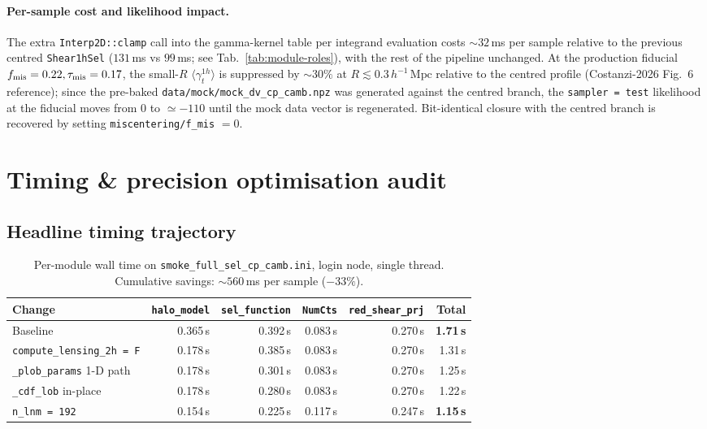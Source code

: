 \documentclass[a4paper, 11pt]{article}
\newcommand{\hMpc}{h^{-1}\,\mathrm{Mpc}}
\newcommand{\modname}[1]{\textcolor{kwcol}{\texttt{#1}}}
\newcommand{\blk}[1]{\textcolor{datablockcol}{\texttt{#1}}}
\newcommand{\pyfile}[1]{{\small\texttt{#1}}}
\begin{document}
\paragraph{Per-sample cost and likelihood impact.}  The extra
\texttt{Interp2D::clamp} call into the gamma-kernel table per
integrand evaluation costs $\sim 32\,$ms per sample relative to the
previous centred \modname{Shear1hSel} ($131\,$ms vs $99\,$ms; see
Tab.~\ref{tab:module-roles}), with the rest of the pipeline
unchanged.  At the production fiducial $f_{\rm mis} = 0.22,
\tau_{\rm mis} = 0.17$, the small-$R$ $\langle\gamma_t^{1h}\rangle$
is suppressed by $\sim 30\%$ at $R \lesssim 0.3\,\hMpc$ relative to
the centred profile (Costanzi-2026 Fig.~6 reference); since the
pre-baked \pyfile{data/mock/mock\_dv\_cp\_camb.npz} was generated
against the centred branch, the \texttt{sampler = test} likelihood at
the fiducial moves from $0$ to $\simeq -110$ until the mock data
vector is regenerated.  Bit-identical closure with the centred
branch is recovered by setting \blk{miscentering/f\_mis} $= 0$.

\section{Timing \& precision optimisation audit}
\label{sec:timing}

\subsection{Headline timing trajectory}

\begin{table}[H]
\centering
\small
\begin{tabular}{l r r r r r}
\toprule
Change & \modname{halo\_model} & \modname{sel\_function} & \modname{NumCts} &
         \modname{red\_shear\_prj} & Total \\
\midrule
Baseline               & 0.365\,s & 0.392\,s & 0.083\,s & 0.270\,s & \textbf{1.71\,s} \\
\texttt{compute\_lensing\_2h = F}   & 0.178\,s & 0.385\,s & 0.083\,s & 0.270\,s & 1.31\,s \\
\texttt{\_plob\_params} 1-D path    & 0.178\,s & 0.301\,s & 0.083\,s & 0.270\,s & 1.25\,s \\
\texttt{\_cdf\_lob} in-place        & 0.178\,s & 0.280\,s & 0.083\,s & 0.270\,s & 1.22\,s \\
\texttt{n\_lnm = 192}               & 0.154\,s & 0.225\,s & 0.117\,s & 0.247\,s & \textbf{1.15\,s} \\
\bottomrule
\end{tabular}
\caption{Per-module wall time on \modname{smoke\_full\_sel\_cp\_camb.ini},
login node, single thread.  Cumulative savings: $\sim 560$\,ms per
sample ($-33\%$).}
\end{table}
\end{document}
